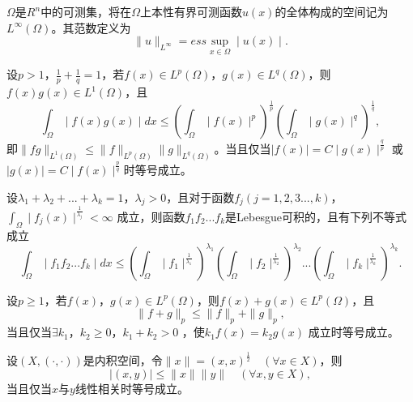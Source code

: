 \documentclass[twoside,UTF8]{nputhesis}
\begin{document}
\begin{Definition}
{
	$\Omega$是$R^n$中的可测集，将在$\Omega$上本性有界可测函数$u(x)$的全体构成的空间记为$L^\infty(\Omega)$。其范数定义为
	\begin{equation*}
	\| u\|_{L^\infty}=ess\sup_{x\in\Omega}\mid u(x)\mid.
	\end{equation*}}
\end{Definition}
\begin{Definition}
{
	设$p>1$，$\frac{1}{p}+\frac{1}{q}=1$，若$f(x)\in L^p(\Omega)$，$g(x)\in L^q(\Omega)$，则$f(x)g(x)\in L^1(\Omega)$，且
	\begin{equation*}
	\int_\Omega\mid f(x)g(x)\mid dx\leq(\int_\Omega\mid f(x)\mid^p)^{\frac{1}{p}}(\int_\Omega\mid g(x)\mid^q)^{\frac{1}{q}},
	\end{equation*}
	即$\| fg\|_{L^1(\Omega)}\leq\| f\|_{L^p(\Omega)}\| g\|_{L^q(\Omega)}$。当且仅当$\mid f(x)\mid=C\mid g(x)\mid^{\frac{q}{p}}$ 或$\mid g(x)\mid=C\mid f(x)\mid^{\frac{p}{q}}$时等号成立。
}
\end{Definition}
\begin{Definition}
{
	设$\lambda_1+\lambda_2+...+\lambda_k=1$，$\lambda_j>0$，且对于函数$f_j(j=1,2,3...,k)$， $\int_\Omega\mid f_j(x)\mid^{\frac{1}{\lambda_j}}<\infty$ 成立，则函数$f_1f_2...f_k$是Lebesgue可积的，且有下列不等式成立
	\begin{equation*}
	\int_\Omega\mid f_1f_2...f_k\mid dx\leq(\int_\Omega\mid f_1\mid^{\frac{1}{\lambda_1}})^{\lambda_1}(\int_\Omega\mid f_2\mid^{\frac{1}{\lambda_2}})^{\lambda_2}...(\int_\Omega\mid f_k\mid^{\frac{1}{\lambda_k}})^{\lambda_k}.
	\end{equation*}
}
\end{Definition}
\begin{Definition}
   [Minkowski不等式]
   {
   	设$p\geq1$，若$f(x)$，$g(x)\in L^p(\Omega)$，则$f(x)+g(x)\in L^p(\Omega)$，且
   	\begin{equation*}
   	\| f+g\|_p\leq\| f\|_p+\| g\|_p,
   	\end{equation*}
   	当且仅当$\exists k_1$，$k_2\geq0$，$k_1+k_2>0$ ，使$k_1f(x)=k_2g(x)$ 成立时等号成立。
   }
\end{Definition}

\begin{Definition}
	{
		设$(X,(\cdot,\cdot))$是内积空间，令$\| x\|=(x,x)^{\frac{1}{2}}\quad(\forall x\in X)$，则
		\begin{equation*}
		\mid (x,y)\mid\leq\| x\|\| y\| \quad(\forall x,y\in X),
		\end{equation*}
		当且仅当$x$与$y$线性相关时等号成立。
	}
\end{Definition}
\end{document}
